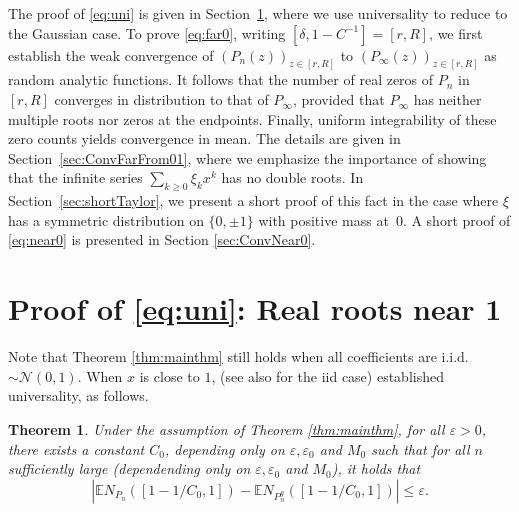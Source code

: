 \documentclass[12pt, reqno]{amsart}
\theoremstyle{plain}
\newtheorem{theorem}{Theorem}[section]
\theoremstyle{definition}
\newcommand\E{{\mathbb{E}}}
\newcommand{\ep}{\varepsilon}
\begin{document}
\vspace{5mm}
The proof of \eqref{eq:uni} is given in Section~\ref{sec:uni}, where we use universality to reduce to the Gaussian case. To prove \eqref{eq:far0}, writing $[\delta, 1 - C^{-1}] = [r, R]$, we first establish the weak convergence of $(P_n(z))_{z\in [r, R]}$ to $(P_\infty(z))_{z\in [r,R]}$ as random analytic functions. 
It follows that the number of real zeros of $P_n$ in $[r,R]$ converges in distribution to that of $P_\infty$, provided that $P_\infty$ has neither multiple roots nor zeros at the endpoints.
Finally, uniform integrability of these zero counts yields convergence in mean. 
The details are given in Section~\ref{sec:ConvFarFrom01}, where we emphasize the importance of showing that the infinite series $\sum_{k\ge 0} \xi_k x^k$ has no double roots. 
In Section~\ref{sec:shortTaylor}, we present a short proof of this fact in the case where $\xi$ has a symmetric distribution on $\{0,\pm 1\}$ with positive mass at~0. A short proof of \eqref{eq:near0} is presented in Section \ref{sec:ConvNear0}. 


 \section{Proof of \eqref{eq:uni}: Real roots near 1}\label{sec:uni}


 

Note that Theorem \ref{thm:mainthm} still holds when all coefficients are i.i.d. $\sim \mathcal N(0, 1)$. When $x$ is close to $1$, \cite{nguyenvuCLT} (see also \cite{NNV16} for the iid case) established universality, as follows.

\begin{theorem}\cite[Corollary 2.2]{nguyenvuCLT}\label{thm:universality}
Under the assumption of Theorem \ref{thm:mainthm}, for all $\ep>0$, there exists a constant $C_0$, depending only on $\ep, \ep_0$ and $M_0$ such that for all $n$ sufficiently large (dependending only on $\ep, \ep_0$ and $M_0$), it holds that 
\begin{equation*} 
   \left |\E N_{P_n}([1 - 1/C_0, 1]) - \E N_{P_n^g}([1 - 1/C_0, 1])\right| \le \ep.
\end{equation*}
\end{theorem}
 
 
 
\end{document}
